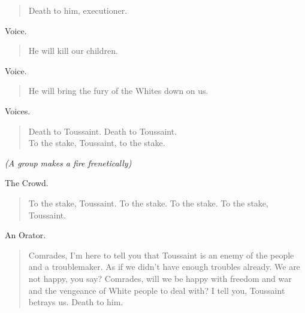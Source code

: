 \documentclass[letterpaper,article,12pt,oneside,notitlepage]{memoir}
\begin{document}
\begin{verse}
Death to him, executioner. \\
\end{verse}

\begin{center}Voice.\end{center}

\begin{verse}
He will kill our children. \\
\end{verse}

\begin{center}Voice.\end{center}

\begin{verse}
He will bring the fury of the Whites down on us. \\
\end{verse}

\clearpage

\begin{center}Voices.\end{center}

\begin{verse}
Death to Toussaint. Death to Toussaint. \\
To the stake, Toussaint, to the stake. \\
\end{verse}

 \textit{(A group makes a fire frenetically)}

\begin{center}The Crowd.\end{center}

\begin{verse}
To the stake, Toussaint. To the stake. To the stake. To the stake, Toussaint. \\
\end{verse}

\begin{center}An Orator.\end{center}

\begin{verse}
\indent Comrades, I'm here to tell you that Toussaint is an enemy of the people and a troublemaker. As if we didn't have enough troubles already. We are not happy, you say? Comrades, will we be happy with freedom and war and the vengeance of White people to deal with? I tell you, Toussaint betrays us. Death to him. \\
\end{verse}
\end{document}
